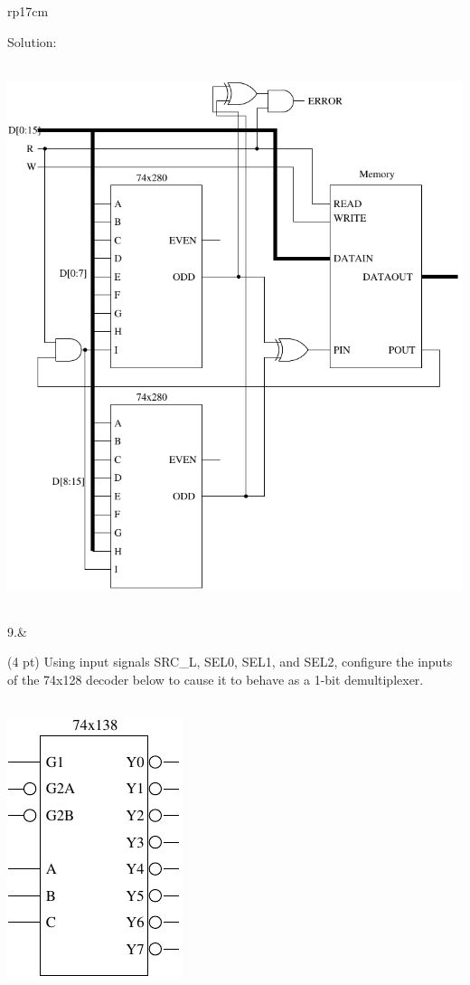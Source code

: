 \documentclass{article}
\begin{document}
\begin{longtable}[l]{rp{17cm}}
\begin{minipage}[t]{\linewidth}
Solution: \\ \\
\begin{center}
  \includegraphics[scale=0.8]{../XOR/Assessments/MemoryCircuitParityExtendedSolution} \\
\end{center}
\end{minipage}\\
\medskip
9.&\begin{minipage}[t]{\linewidth}(4 pt) Using input signals SRC\_L, SEL0, SEL1, and SEL2, configure the inputs of the 74x128 decoder below to cause it to behave as a 1-bit demultiplexer.\\ \\
\begin{center}
  \includegraphics{../Muxes/Assessments/74x138Schematic}
\end{center}


\end{minipage}
\end{longtable}
\end{document}
